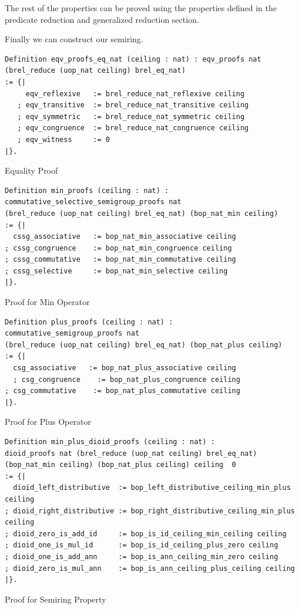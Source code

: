 \documentclass[a4paper,12pt,twoside,openright]{report}
\begin{document}
The rest of the properties can be proved using the properties defined in the predicate reduction and generalized reduction section.

Finally we can construct our semiring.

\begin{listing}[H]
\begin{verbatim}
Definition eqv_proofs_eq_nat (ceiling : nat) : eqv_proofs nat 
(brel_reduce (uop_nat ceiling) brel_eq_nat)
:= {| 
     eqv_reflexive   := brel_reduce_nat_reflexive ceiling
   ; eqv_transitive  := brel_reduce_nat_transitive ceiling
   ; eqv_symmetric   := brel_reduce_nat_symmetric ceiling
   ; eqv_congruence  := brel_reduce_nat_congruence ceiling
   ; eqv_witness     := 0
|}. 
\end{verbatim}
\caption{Equality Proof} 
\label{coq:proof:eqv_proofs_eq_nat}
\end{listing}
\begin{listing}[H]
\begin{verbatim}
Definition min_proofs (ceiling : nat) : 
commutative_selective_semigroup_proofs nat 
(brel_reduce (uop_nat ceiling) brel_eq_nat) (bop_nat_min ceiling) 
:= {|
  cssg_associative   := bop_nat_min_associative ceiling
; cssg_congruence    := bop_nat_min_congruence ceiling
; cssg_commutative   := bop_nat_min_commutative ceiling
; cssg_selective     := bop_nat_min_selective ceiling                                         
|}.
\end{verbatim}
\caption{Proof for Min Operator} 
\label{coq:def:min_proofs}
\end{listing}
\begin{listing}[H]
\begin{verbatim}
Definition plus_proofs (ceiling : nat) : 
commutative_semigroup_proofs nat 
(brel_reduce (uop_nat ceiling) brel_eq_nat) (bop_nat_plus ceiling) 
:= {|
  csg_associative   := bop_nat_plus_associative ceiling
  ; csg_congruence    := bop_nat_plus_congruence ceiling
; csg_commutative    := bop_nat_plus_commutative ceiling                                                 
|}.
\end{verbatim}
\caption{Proof for Plus Operator} 
\label{coq:def:plus_proofs}
\end{listing}
\begin{listing}[H]
\begin{verbatim}
Definition min_plus_dioid_proofs (ceiling : nat) : 
dioid_proofs nat (brel_reduce (uop_nat ceiling) brel_eq_nat) 
(bop_nat_min ceiling) (bop_nat_plus ceiling) ceiling  0 
:= {|  
  dioid_left_distributive  := bop_left_distributive_ceiling_min_plus ceiling
; dioid_right_distributive := bop_right_distributive_ceiling_min_plus ceiling
; dioid_zero_is_add_id     := bop_is_id_ceiling_min_ceiling ceiling 
; dioid_one_is_mul_id      := bop_is_id_ceiling_plus_zero ceiling 
; dioid_one_is_add_ann     := bop_is_ann_ceiling_min_zero ceiling    
; dioid_zero_is_mul_ann    := bop_is_ann_ceiling_plus_ceiling ceiling 
|}.
\end{verbatim}
\caption{Proof for Semiring Property} 
\label{coq:def:min_plus_dioid_proofs}
\end{listing}
\end{document}
